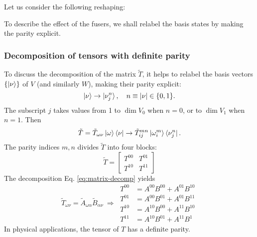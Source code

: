 \documentclass[11pt]{article}
\begin{document}
Let us consider the following reshaping:



To describe the effect of the fusers, we shall relabel the basis states by making the parity explicit. 

\subsubsection{Decomposition of tensors with definite parity}

To discuss the decomposition of the matrix $\tilde{T}$, it helps to relabel the basis vectors $\{\ket{\nu}\}$ of $V$ (and similarly $W$), making their parity explicit:
\begin{equation*}
    \ket{\nu} \to \ket{\nu^n_j}, 
    \quad n \equiv |\nu| \in \{0,1\}. 
\end{equation*}
The subscript $j$ takes values from 1 to $\dim V_0$ when $n = 0$, or to $\dim V_1$ when $n = 1$. Then 
\begin{equation}
    \tilde{T} 
    = \tilde{T}_{\omega \nu}
    \ket{\omega} \bra{\nu}
    \to \tilde{T}^{mn}_{ij}
    \ket{\omega^m_i} \bra{\nu^n_j}. 
\end{equation}
The parity indices $m,n$ divides $\tilde{T}$ into four blocks:
\begin{equation}
    \tilde{T} = \begin{bmatrix}
        T^{00} & T^{01} \\ T^{10} & T^{11}
    \end{bmatrix}
    \label{eq:matT-blocks}
\end{equation}
The decomposition Eq. \eqref{eq:matrix-decomp} yields
\begin{equation}
    \tilde{T}_{\omega \nu}
    = \tilde{A}_{\omega \alpha} 
    \tilde{B}_{\alpha \nu}
    \ \Rightarrow \ 
    \begin{aligned}
        T^{00} 
        &= A^{00} B^{00} + A^{01} B^{10} 
        \\
        T^{01} 
        &= A^{00} B^{01} + A^{01} B^{11}
        \\
        T^{10} 
        &= A^{10} B^{00} + A^{11} B^{10}
        \\
        T^{11} 
        &= A^{10} B^{01} + A^{11} B^{1}
    \end{aligned}
    \label{eq:matT-decomp}
\end{equation}
In physical applications, the tensor of $T$ has a definite parity. 
\end{document}
